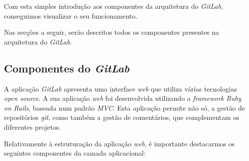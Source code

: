 \documentclass[12pt,a4paper]{article}
\begin{document}
Com esta simples introdução aos componentes da arquitetura do \emph{GitLab}, conseguimos visualizar o seu funcionamento.

Nas secções a seguir, serão descritos todos os componentes presentes na arquitetura do \emph{GitLab}.


\subsection{Componentes do \emph{GitLab}}
A aplicação \emph{GitLab} apresenta uma interface \emph{web} que utiliza várias tecnologias \emph{open source}. A sua aplicação \emph{web} foi desenvolvida utilizando a \emph{framework} \emph{Ruby on Rails}, baseada num padrão \emph{MVC}. Esta aplicação permite não só, a gestão de repositórios \emph{git}, como também a gestão de comentários, que complementam os diferentes projetos.

Relativamente à estruturação da aplicação \emph{web}, é importante destacarmos os seguintes componentes da camada aplicacional:
\end{document}
